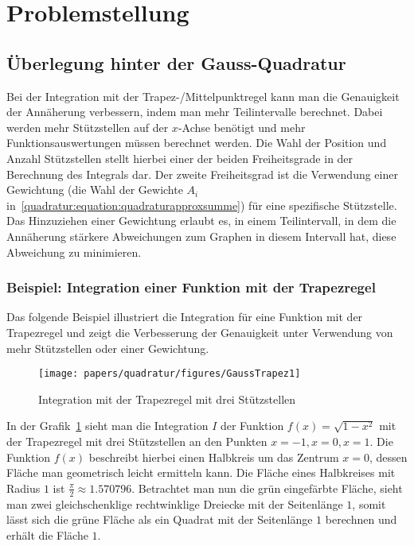 %
%
%
\section{Problemstellung
\label{quadratur:section:problemstellung}}
\subsection{Überlegung hinter der Gauss-Quadratur \label{quadratur:subsection:ueberlegung}}

Bei der Integration mit der Trapez-/Mittelpunktregel kann man die Genauigkeit
der Annäherung verbessern, indem man mehr Teilintervalle berechnet.
Dabei werden mehr Stützstellen auf der $x$-Achse benötigt und mehr Funktionsauswertungen
müssen berechnet werden. 
Die Wahl der Position und Anzahl Stützstellen stellt hierbei einer der beiden Freiheitsgrade
in der Berechnung des Integrals dar.
Der zweite Freiheitsgrad ist die Verwendung einer Gewichtung (die Wahl der Gewichte $A_{i}$ in~\eqref{quadratur:equation:quadraturapproxsumme}) 
für eine spezifische Stützstelle.
Das Hinzuziehen einer Gewichtung erlaubt es, in einem Teilintervall, 
in dem die Annäherung stärkere Abweichungen zum Graphen in diesem Intervall hat, 
diese Abweichung zu minimieren.


\subsubsection{Beispiel: Integration einer Funktion mit der Trapezregel}
Das folgende Beispiel illustriert die Integration für eine Funktion mit der Trapezregel und
zeigt die Verbesserung der Genauigkeit unter Verwendung von mehr Stützstellen oder einer Gewichtung.
\begin{figure}
    \centering
    \texttt{[image: papers/quadratur/figures/GaussTrapez1]}
    \caption{Integration mit der Trapezregel mit drei Stützstellen
    \label{quadratur:figure:trapez1}} 
\end{figure}
In der Grafik~\ref{quadratur:figure:trapez1} sieht man die Integration  $I$ der Funktion $f(x) = \sqrt{1-x^{2}}$
mit der Trapezregel mit drei Stützstellen an den Punkten $x=-1, x=0, x=1$.
Die Funktion $f(x)$ beschreibt hierbei einen Halbkreis um das Zentrum $x=0$, 
dessen Fläche man geometrisch leicht ermitteln kann.
Die Fläche eines Halbkreises mit Radius $1$ ist $\frac{\pi}{2} \approx 1.570796$.
Betrachtet man nun die grün eingefärbte Fläche, sieht man zwei gleichschenklige rechtwinklige Dreiecke mit der Seitenlänge $1$,
somit lässt sich die grüne Fläche als ein Quadrat mit der Seitenlänge $1$ berechnen und erhält die Fläche $1$.

